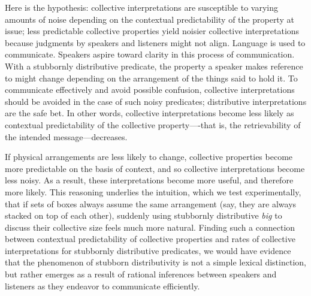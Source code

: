 \documentclass[linguex]{sp}
\begin{document}
Here is the hypothesis: collective interpretations are susceptible to varying amounts of noise depending on the contextual predictability of the property at issue; less predictable collective properties yield noisier collective interpretations because judgments by speakers and listeners might not align. Language is used to communicate. Speakers aspire toward clarity in this process of communication. With a stubbornly distributive predicate, the property a speaker makes reference to might change depending on the arrangement of the things said to hold it. To communicate effectively and avoid possible confusion, collective interpretations should be avoided in the case of such noisy predicates; distributive interpretations are the safe bet. In other words, collective interpretations become less likely as contextual predictability of the collective property----that is, the retrievability of the intended message---decreases. 

If physical arrangements are less likely to change, collective properties become more predictable on the basis of context, and so collective interpretations become less noisy. As a result, these interpretations become more useful, and therefore more likely. This reasoning underlies the intuition, which we test experimentally, that if sets of boxes always assume the same arrangement (say, they are always stacked on top of each other), suddenly using stubbornly distributive \emph{big} to discuss their collective size feels much more natural.
Finding such a connection between contextual predictability of collective properties and rates of collective interpretations for stubbornly distributive predicates, we would have evidence that the phenomenon of stubborn distributivity is not a simple lexical distinction, but rather emerges as a result of rational inferences between speakers and listeners as they endeavor to communicate efficiently. %
\end{document}
